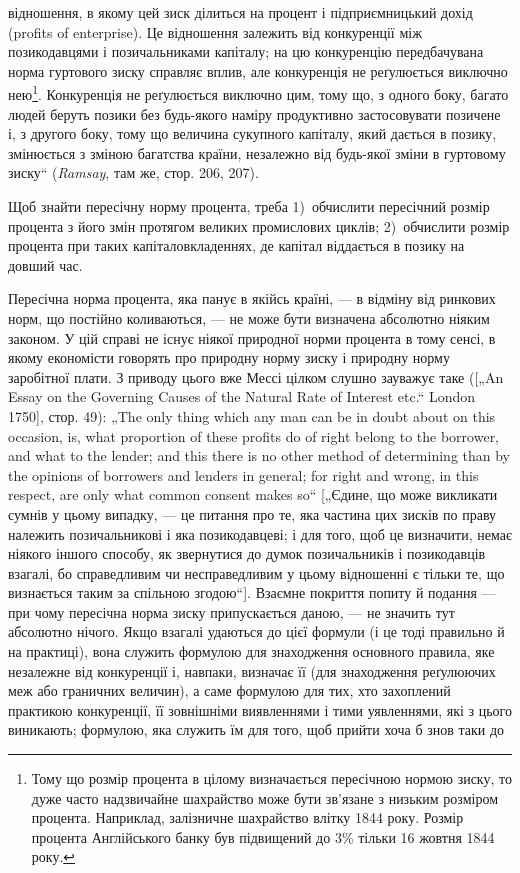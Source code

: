 \parcont{}  %
відношення, в якому цей зиск ділиться на процент і підприємницький
дохід (profits of enterprise). Це відношення залежить
від конкуренції між позикодавцями і позичальниками капіталу;
на цю конкуренцію передбачувана норма гуртового зиску
справляє вплив, але конкуренція не реґулюється виключно нею\footnote{
Тому що розмір процента в цілому визначається пересічною нормою
зиску, то дуже часто надзвичайне шахрайство може бути зв’язане з низьким
розміром процента. Наприклад, залізничне шахрайство влітку 1844 року. Розмір
процента Англійського банку був підвищений до 3\% тільки 16 жовтня
1844 року.
}.
Конкуренція не реґулюється виключно цим, тому що, з одного
боку, багато людей беруть позики без будь-якого наміру продуктивно
застосовувати позичене і, з другого боку, тому що величина
сукупного капіталу, який дається в позику, змінюється з зміною
багатства країни, незалежно від будь-якої зміни в гуртовому
зиску“ (\emph{Ramsay}, там же, стор. 206, 207).

Щоб знайти пересічну норму процента, треба 1)~обчислити
пересічний розмір процента з його змін протягом великих промислових
циклів; 2)~обчислити розмір процента при таких капіталовкладеннях,
де капітал віддається в позику на довший час.

Пересічна норма процента, яка панує в якійсь країні, — в відміну
від ринкових норм, що постійно коливаються, — не може бути
визначена абсолютно ніяким законом. У цій справі не існує ніякої
природної норми процента в тому сенсі, в якому економісти
говорять про природну норму зиску і природну норму заробітної
плати. З приводу цього вже Мессі цілком слушно зауважує
таке ([„An Essay on the Governing Causes of the Natural Rate of Interest
etc.“ London 1750], стор. 49): „The only thing which any man can
be in doubt about on this occasion, is, what proportion of these profits
do of right belong to the borrower, and what to the lender; and this there
is no other method of determining than by the opinions of borrowers
and lenders in general; for right and wrong, in this respect, are
only what common consent makes so“ [„Єдине, що може викликати
сумнів у цьому випадку, — це питання про те, яка частина цих
зисків по праву належить позичальникові і яка позикодавцеві;
і для того, щоб це визначити, немає ніякого іншого способу, як
звернутися до думок позичальників і позикодавців взагалі, бо
справедливим чи несправедливим у цьому відношенні є тільки те,
що визнається таким за спільною згодою“]. Взаємне покриття
попиту й подання — при чому пересічна норма зиску припускається
даною, — не значить тут абсолютно нічого. Якщо взагалі
удаються до цієї формули (і це тоді правильно й на практиці),
вона служить формулою для знаходження основного правила,
яке незалежне від конкуренції і, навпаки, визначає її (для знаходження
реґулюючих меж або граничних величин), а саме формулою
для тих, хто захоплений практикою конкуренції, її зовнішніми
виявленнями і тими уявленнями, які з цього виникають; формулою,
яка служить їм для того, щоб прийти хоча б знов таки до
\parbreak{}  %
